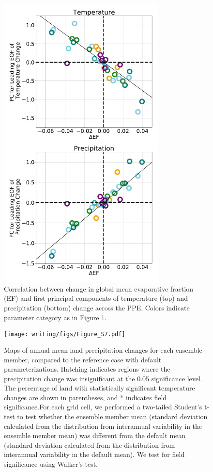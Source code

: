 \documentclass[draft, grl]{agujournal2019}
\begin{document}
\begin{figure}[htb!]
\centering
\noindent\includegraphics[width=0.75\textwidth]{writing/figs/Figure_S_EOF_vs_Temperature_and_Precipitation.pdf}
\caption{Correlation between change in global mean evaporative fraction (EF) and first principal components of temperature (top) and precipitation (bottom) change across the PPE. Colors indicate parameter category as in Figure 1.}
\label{fig:supp_EF_EOF_correlation}
\end{figure}

\begin{figure}[htb!]
\noindent\texttt{[image: writing/figs/Figure\_S7.pdf]}
\caption{Maps of annual mean land precipitation changes for each ensemble member, compared to the reference case with default parameterizations. Hatching indicates regions where the precipitation change was insignificant at the 0.05 significance level. The percentage of land with statistically significant temperature changes are shown in parentheses, and * indicates field significance.For each grid cell, we performed a two-tailed Student’s t-test to test whether the ensemble member mean (standard deviation calculated from the distribution from interannual variability in the ensemble member mean) was different from the default mean (standard deviation calculated from the distribution from interannual variability in the default mean). We test for field significance using Walker’s test.}
\label{fig:supp_maps_precip}
\end{figure}
\end{document}
